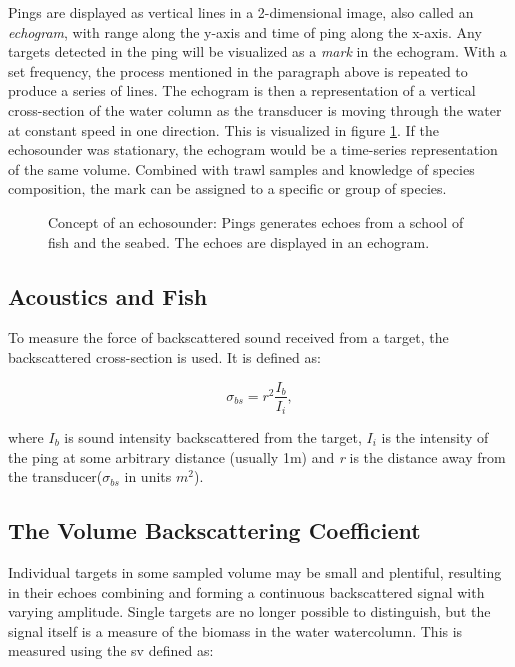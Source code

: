     Pings are displayed as vertical lines in a 2-dimensional image, also called an \textit{echogram}, with range along the y-axis and time of ping along the x-axis. Any targets detected in the ping will be visualized as a \textit{mark} in the echogram. With a set frequency, the process mentioned in the paragraph above is repeated to produce a series of lines. The echogram is then a representation of a vertical cross-section of the water column as the transducer is moving through the water at constant speed in one direction. This is visualized in figure \ref{echogram}. If the echosounder was stationary, the echogram would be a time-series representation of the same volume. Combined with trawl samples and knowledge of species composition, the mark can be assigned to a specific or group of species\cite{simmonds2008fisheries}.
    
    \begin{figure}[H]
        \centering
            
        \caption[Echosounder]{Concept of an echosounder: Pings generates echoes from a school of fish and the seabed. The echoes are displayed in an echogram.}
      	\medskip 
        \label{echogram}
    \end{figure}

    
\subsection{Acoustics and Fish}
    To measure the force of backscattered sound received from a target, the backscattered cross-section is used. It is defined as:
    
    \begin{equation}
        \sigma_{bs} = r^{2}\frac{I_{b}}{I_{i}},
    \end{equation}

    where $I_{b}$ is sound intensity backscattered from the target, $I_{i}$ is the intensity of the ping at some arbitrary distance (usually 1m) and \textit{r} is the distance away from the transducer($\sigma_{bs}$ in units $m^{2}$)\cite{simmonds2008fisheries}. 

\subsection{The Volume Backscattering Coefficient}
    Individual targets in some sampled volume may be small and plentiful, resulting in their echoes combining and forming a continuous backscattered signal with varying amplitude. Single targets are no longer possible to distinguish, but the signal itself is a measure of the biomass in the water watercolumn. This is measured using the \gls{sv} defined as:
    
